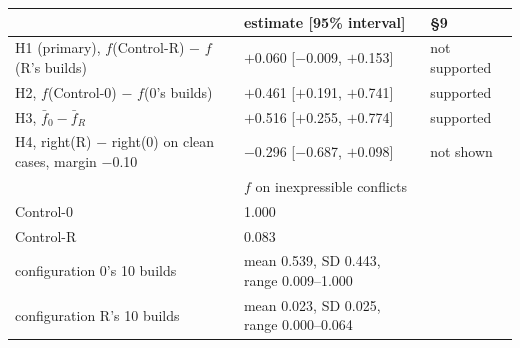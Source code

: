 \begin{tabularx}{\linewidth}{Xll}
\toprule
& estimate [95\% interval] & \S 9 \\
\midrule
H1 (primary), $f$(Control-R) $-$ $f$(R's builds) & $+$0.060 [$-$0.009, $+$0.153] & not supported \\
H2, $f$(Control-0) $-$ $f$(0's builds) & $+$0.461 [$+$0.191, $+$0.741] & supported \\
H3, $\bar f_0 - \bar f_R$ & $+$0.516 [$+$0.255, $+$0.774] & supported \\
H4, right(R) $-$ right(0) on clean cases, margin $-$0.10 & $-$0.296 [$-$0.687, $+$0.098] & not shown \\
\midrule
& $f$ on inexpressible conflicts & \\
\quad Control-0 & 1.000 & \\
\quad Control-R & 0.083 & \\
\quad configuration 0's 10 builds & mean 0.539, SD 0.443, range 0.009--1.000 & \\
\quad configuration R's 10 builds & mean 0.023, SD 0.025, range 0.000--0.064 & \\
\bottomrule
\end{tabularx}
